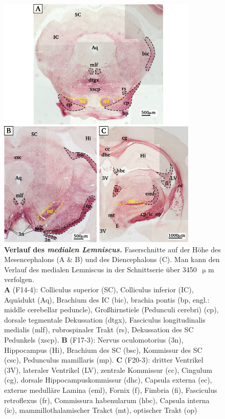\documentclass[12pt,a4paper,pdftex]{article}
\begin{document}
\begin{figure}[H]
    \centering
    \includegraphics[width = 0.85\textwidth] {pictures/somatosensory/medial_lemniscus.png}
    \caption[Verlauf des medialen Lemniscus]{\small{\textbf{Verlauf des \textit{medialen Lemniscus.}} Faserschnitte auf der Höhe des Mesencephalons (A \& B) und des Diencephalons (C). Man kann den Verlauf des medialen Lemniscus in der Schnittserie über 3450~$\upmu$m verfolgen.\\
    \textbf{A} (F14-4): Colliculus superior (SC), Colliculus inferior (IC), Aquädukt (Aq), Brachium des IC (bic), brachia pontis (bp, engl.: middle cerebellar peduncle), Großhirnstiele (Pedunculi cerebri) (cp), dorsale tegmentale Dekussation (dtgx), Fasciculus longitudinalis medialis (mlf), rubrospinaler Trakt (rs), Dekussation des SC Pedunkels (xscp).
    \textbf{B} (F17-3): Nervus oculomotorius (3n), Hippocampus (Hi), Brachium des SC (bsc), Kommissur des SC (csc), Pedunculus mamillaris (mp).
    \textbf{C} (F20-3): dritter Ventrikel (3V), lateraler Ventrikel (LV), zentrale Kommissur (cc), Cingulum (cg), dorsale Hippocampuskommissur (dhc), Capsula externa (ec), externe medulläre Lamina (eml), Fornix (f), Fimbria (fi), Fasciculus retroflexus (fr), Commissura habenularum (hbc), Capsula interna (ic), mammillothalamischer Trakct (mt), optischer Trakt (op)}}
    \label{fig:medialer_lemniscus}
\end{figure}
\end{document}
